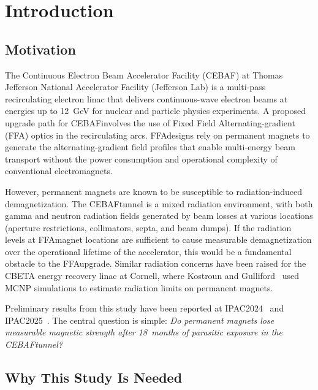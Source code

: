 \documentclass[11pt,letterpaper]{article}
\newcommand{\CEBAF}{CEBAF}
\newcommand{\FFA}{FFA}
\newcommand{\JLab}{Jefferson Lab}
\begin{document}
\tableofcontents
\newpage

\section{Introduction}
\label{sec:intro}

\subsection{Motivation}

The Continuous Electron Beam Accelerator Facility (\CEBAF) at Thomas Jefferson
National Accelerator Facility (\JLab) is a multi-pass recirculating electron
linac that delivers continuous-wave electron beams at energies up to
\SI{12}{GeV} for nuclear and particle physics experiments. A proposed upgrade
path for \CEBAF involves the use of Fixed Field Alternating-gradient (\FFA)
optics in the recirculating arcs. \FFA designs rely on permanent magnets to
generate the alternating-gradient field profiles that enable multi-energy beam
transport without the power consumption and operational complexity of
conventional electromagnets.

However, permanent magnets are known to be susceptible to radiation-induced
demagnetization. The \CEBAF tunnel is a mixed radiation environment, with both
gamma and neutron radiation fields generated by beam losses at various locations
(aperture restrictions, collimators, septa, and beam dumps). If the radiation
levels at \FFA magnet locations are sufficient to cause measurable
demagnetization over the operational lifetime of the accelerator, this would be
a fundamental obstacle to the \FFA upgrade. Similar radiation concerns have
been raised for the CBETA energy recovery linac at Cornell, where Kostroun and
Gulliford~\cite{Kostroun2019} used MCNP simulations to estimate radiation
limits on permanent magnets.

Preliminary results from this study have been reported at
IPAC2024~\cite{Bodenstein2024a,Bodenstein2024b} and
IPAC2025~\cite{Bodenstein2025}. The central question is simple: \textit{Do
permanent magnets lose measurable magnetic strength after 18~months of
parasitic exposure in the \CEBAF tunnel?}

\subsection{Why This Study Is Needed}
\end{document}
